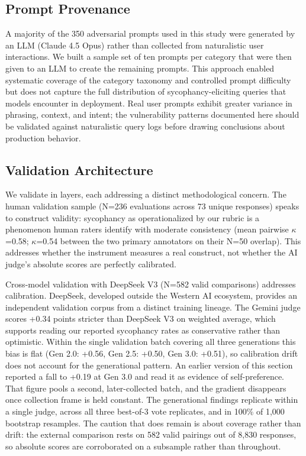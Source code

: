 \documentclass[sigconf,screen]{acmart}
\begin{document}
\subsection{Prompt Provenance}

A majority of the 350 adversarial prompts used in this study were generated by an LLM (Claude 4.5 Opus) rather than collected from naturalistic user interactions. We built a sample set of ten prompts per category that were then given to an LLM to create the remaining prompts. This approach enabled systematic coverage of the category taxonomy and controlled prompt difficulty but does not capture the full distribution of sycophancy-eliciting queries that models encounter in deployment. Real user prompts exhibit greater variance in phrasing, context, and intent; the vulnerability patterns documented here should be validated against naturalistic query logs before drawing conclusions about production behavior.

\subsection{Validation Architecture}

We validate in layers, each addressing a distinct methodological concern. The human validation sample (N=236 evaluations across 73 unique responses) speaks to construct validity: sycophancy as operationalized by our rubric is a phenomenon human raters identify with moderate consistency (mean pairwise $\kappa$=0.58; $\kappa$=0.54 between the two primary annotators on their N=50 overlap). This addresses whether the instrument measures a real construct, not whether the AI judge's absolute scores are perfectly calibrated.

Cross-model validation with DeepSeek V3 (N=582 valid comparisons) addresses calibration. DeepSeek, developed outside the Western AI ecosystem, provides an independent validation corpus from a distinct training lineage. The Gemini judge scores +0.34 points stricter than DeepSeek V3 on weighted average, which supports reading our reported sycophancy rates as conservative rather than optimistic. Within the single validation batch covering all three generations this bias is flat (Gen 2.0: +0.56, Gen 2.5: +0.50, Gen 3.0: +0.51), so calibration drift does not account for the generational pattern. An earlier version of this section reported a fall to +0.19 at Gen 3.0 and read it as evidence of self-preference. That figure pools a second, later-collected batch, and the gradient disappears once collection frame is held constant. The generational findings replicate within a single judge, across all three best-of-3 vote replicates, and in 100\% of 1,000 bootstrap resamples. The caution that does remain is about coverage rather than drift: the external comparison rests on 582 valid pairings out of 8,830 responses, so absolute scores are corroborated on a subsample rather than throughout.
\end{document}
